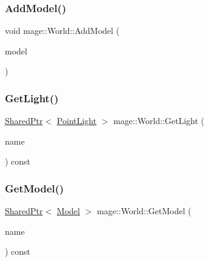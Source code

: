 \hypertarget{classmage_1_1_world_a4b7287a11ff316b029ec7727ed0d076d}{}\label{classmage_1_1_world_a4b7287a11ff316b029ec7727ed0d076d} 
\subsubsection{\texorpdfstring{Add\+Model()}{AddModel()}}
{\footnotesize\ttfamily void mage\+::\+World\+::\+Add\+Model (\begin{DoxyParamCaption}\item[{\hyperlink{namespacemage_a1e01ae66713838a7a67d30e44c67703e}{Shared\+Ptr}$<$ \hyperlink{classmage_1_1_model}{Model} $>$}]{model }\end{DoxyParamCaption})}

\hypertarget{classmage_1_1_world_ac7c1a382b10e67bd42493af3966c9212}{}\label{classmage_1_1_world_ac7c1a382b10e67bd42493af3966c9212} 
\subsubsection{\texorpdfstring{Get\+Light()}{GetLight()}}
{\footnotesize\ttfamily \hyperlink{namespacemage_a1e01ae66713838a7a67d30e44c67703e}{Shared\+Ptr}$<$ \hyperlink{classmage_1_1_point_light}{Point\+Light} $>$ mage\+::\+World\+::\+Get\+Light (\begin{DoxyParamCaption}\item[{const string \&}]{name }\end{DoxyParamCaption}) const}

\hypertarget{classmage_1_1_world_ac91abee028df87d8879332e0df3d9e8a}{}\label{classmage_1_1_world_ac91abee028df87d8879332e0df3d9e8a} 
\subsubsection{\texorpdfstring{Get\+Model()}{GetModel()}}
{\footnotesize\ttfamily \hyperlink{namespacemage_a1e01ae66713838a7a67d30e44c67703e}{Shared\+Ptr}$<$ \hyperlink{classmage_1_1_model}{Model} $>$ mage\+::\+World\+::\+Get\+Model (\begin{DoxyParamCaption}\item[{const string \&}]{name }\end{DoxyParamCaption}) const}

